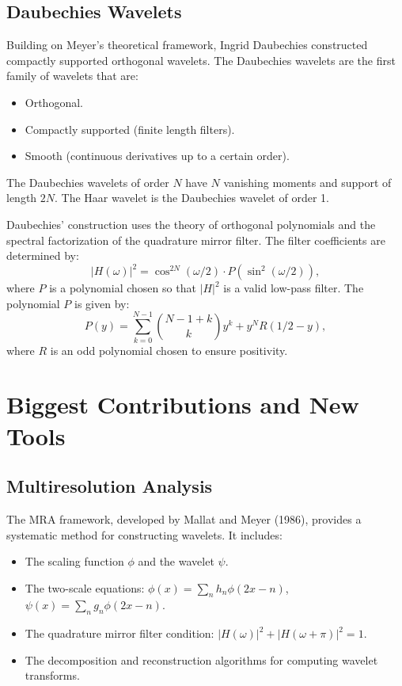 \subsection{Daubechies Wavelets}

Building on Meyer's theoretical framework, Ingrid Daubechies constructed compactly supported orthogonal wavelets. The Daubechies wavelets are the first family of wavelets that are:
\begin{itemize}
\item Orthogonal.
\item Compactly supported (finite length filters).
\item Smooth (continuous derivatives up to a certain order).
\end{itemize}

The Daubechies wavelets of order $N$ have $N$ vanishing moments and support of length $2N$. The Haar wavelet is the Daubechies wavelet of order 1.

Daubechies' construction uses the theory of orthogonal polynomials and the spectral factorization of the quadrature mirror filter. The filter coefficients are determined by:
\[
|H(\omega)|^2 = \cos^{2N}(\omega/2) \cdot P(\sin^2(\omega/2)),
\]
where $P$ is a polynomial chosen so that $|H|^2$ is a valid low-pass filter. The polynomial $P$ is given by:
\[
P(y) = \sum_{k=0}^{N-1} \binom{N-1+k}{k} y^k + y^N R(1/2 - y),
\]
where $R$ is an odd polynomial chosen to ensure positivity.

\section{Biggest Contributions and New Tools}

\subsection{Multiresolution Analysis}

The MRA framework, developed by Mallat and Meyer (1986), provides a systematic method for constructing wavelets. It includes:
\begin{itemize}
\item The scaling function $\phi$ and the wavelet $\psi$.
\item The two-scale equations: $\phi(x) = \sum_n h_n \phi(2x - n)$, $\psi(x) = \sum_n g_n \phi(2x - n)$.
\item The quadrature mirror filter condition: $|H(\omega)|^2 + |H(\omega + \pi)|^2 = 1$.
\item The decomposition and reconstruction algorithms for computing wavelet transforms.
\end{itemize}

